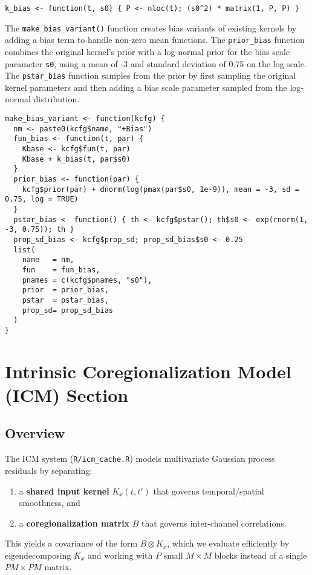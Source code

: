 \documentclass[11pt]{article}
\begin{document}
\begin{lstlisting}
k_bias <- function(t, s0) { P <- nloc(t); (s0^2) * matrix(1, P, P) }
\end{lstlisting}

The \texttt{make\_bias\_variant()} function creates bias variants of existing kernels by adding a bias term to handle non-zero mean functions. The \texttt{prior\_bias} function combines the original kernel's prior with a log-normal prior for the bias scale parameter \texttt{s0}, using a mean of -3 and standard deviation of 0.75 on the log scale. The \texttt{pstar\_bias} function samples from the prior by first sampling the original kernel parameters and then adding a bias scale parameter sampled from the log-normal distribution.

\begin{lstlisting}
make_bias_variant <- function(kcfg) {
  nm <- paste0(kcfg$name, "+Bias")
  fun_bias <- function(t, par) {
    Kbase <- kcfg$fun(t, par)
    Kbase + k_bias(t, par$s0)
  }
  prior_bias <- function(par) {
    kcfg$prior(par) + dnorm(log(pmax(par$s0, 1e-9)), mean = -3, sd = 0.75, log = TRUE)
  }
  pstar_bias <- function() { th <- kcfg$pstar(); th$s0 <- exp(rnorm(1, -3, 0.75)); th }
  prop_sd_bias <- kcfg$prop_sd; prop_sd_bias$s0 <- 0.25
  list(
    name   = nm,
    fun    = fun_bias,
    pnames = c(kcfg$pnames, "s0"),
    prior  = prior_bias,
    pstar  = pstar_bias,
    prop_sd= prop_sd_bias
  )
}
\end{lstlisting}

\section{Intrinsic Coregionalization Model (ICM) Section}

\subsection{Overview}

The ICM system (\texttt{R/icm\_cache.R}) models multivariate Gaussian process residuals by separating:
\begin{enumerate}[label=(\alph*)]
  \item a \textbf{shared input kernel} $K_x(t,t')$ that governs temporal/spatial smoothness, and
  \item a \textbf{coregionalization matrix} $B$ that governs inter-channel correlations.
\end{enumerate}
This yields a covariance of the form $B \otimes K_x$, which we evaluate efficiently by eigendecomposing $K_x$ and working with $P$ small $M\times M$ blocks instead of a single $PM\times PM$ matrix.
\end{document}
